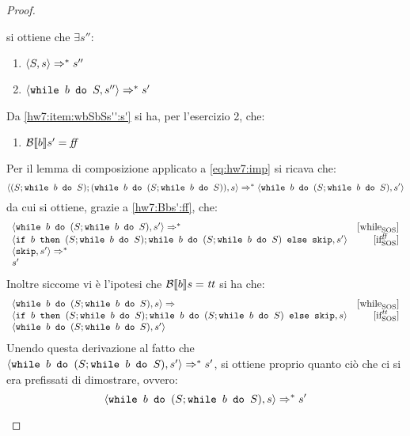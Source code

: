 {\begin{proof}
\begin{itemize}
	
	si ottiene che $\exists s''$:
	\begin{enumerate}[label=(\alph*)]
		\item $\confSs{S}{s} \Rar{*} s''$
		\item $\confSs{\wbS{b}{S}}{s''} \Rar{*} s'$
		\label{hw7:item:wbSbSs'':s'}
	\end{enumerate}
	Da \ref{hw7:item:wbSbSs'':s'} si ha, per l'esercizio 2, che:
	\begin{enumerate}[label=(\Roman*)]
		\item $\B{b}' = \semfalse$
		\label{hw7:Bbs':ff}
	\end{enumerate}  
	Per il lemma di composizione applicato a \ref{eq:hw7:imp} si ricava che:
	$$
	\confSs{(S; \wbS{b}{S}); (\wbS{b}{(S; \wbS{b}{S})})}{s} \Rar{*} \confSs{\wbS{b}{(S; \wbS{b}{S})}}{s'} 
	$$
	da cui si ottiene, grazie a \ref{hw7:Bbs':ff}, che:
	$$
	\begin{array}{lr}
	\confSs{\wbS{b}{(S; \wbS{b}{S})}}{s'} \Rar{*} & \whileSOS\\
	\confSs{\ifABC{b}{(S; \wbS{b}{S}); \wbS{b}{(S; \wbS{b}{S})}}{\skipForFriends}}{s'} & \ifffSOS\\
	\confSs{\skipForFriends}{s'} \Rar{*} & \\
	s' & \\
	\label{hw:arary}
	\end{array}
	$$  
	Inoltre siccome vi è l'ipotesi che $\B{b} = \semtrue$ si ha che:
	$$
	\begin{array}{lr}
	\confSs{\wbS{b}{(S; \wbS{b}{S})}}{s} \Rar{ } & \whileSOS\\
	\confSs{\ifABC{b}{(S; \wbS{b}{S}); \wbS{b}{(S; \wbS{b}{S})}}{\skipForFriends}}{s} & \ifttSOS \\
	\confSs{\wbS{b}{(S; \wbS{b}{S})}}{s'} & 
	\end{array}
	$$
	Unendo questa derivazione al fatto che
	$\confSs{\wbS{b}{(S; \wbS{b}{S})}}{s'} \Rar{*} s'$, si ottiene
	proprio quanto ciò che ci si era prefissati di dimostrare, ovvero:
	$$
	\confSs{\wbS{b}{(S; \wbS{b}{S})}}{s} \Rar{*} s'
	$$
\end{itemize}



\end{proof}}
